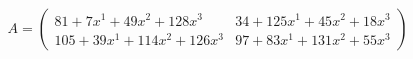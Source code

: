 \documentclass[preview]{standalone}
\begin{document}
\begin{align*}
A = \begin{pmatrix}81 + 7x^{1} + 49x^{2} + 128x^{3} & 34 + 125x^{1} + 45x^{2} + 18x^{3} \\ 105 + 39x^{1} + 114x^{2} + 126x^{3} & 97 + 83x^{1} + 131x^{2} + 55x^{3}\end{pmatrix}
\end{align*}
\end{document}
